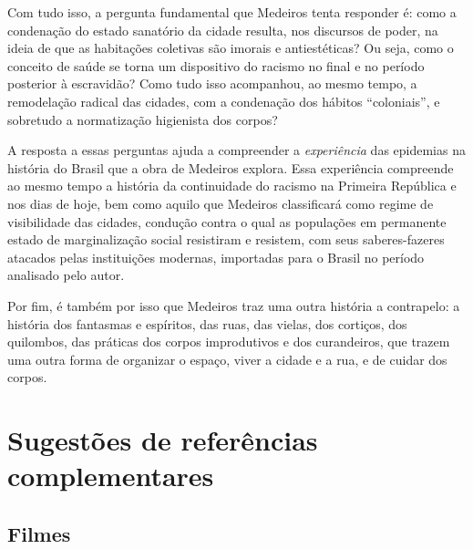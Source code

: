 \documentclass[12pt]{extarticle}
\begin{document}
Com tudo isso, a pergunta fundamental que Medeiros tenta responder é:
como a condenação do estado sanatório da cidade resulta, nos discursos
de poder, na ideia de que as habitações coletivas são imorais e
antiestéticas? Ou seja, como o conceito de saúde se torna um dispositivo
do racismo no final e no período posterior à escravidão? Como tudo isso
acompanhou, ao mesmo tempo, a remodelação radical das cidades, com a
condenação dos hábitos ``coloniais'', e sobretudo a normatização
higienista dos corpos?

A resposta a essas perguntas ajuda a compreender a \emph{experiência}
das epidemias na história do Brasil que a obra de Medeiros explora. Essa
experiência compreende ao mesmo tempo a história da continuidade do
racismo na Primeira República e nos dias de hoje, bem como aquilo que
Medeiros classificará como regime de visibilidade das cidades, condução
contra o qual as populações em permanente estado de marginalização
social resistiram e resistem, com seus saberes-fazeres atacados pelas
instituições modernas, importadas para o Brasil no período analisado
pelo autor.

Por fim, é também por isso que Medeiros traz uma outra história a
contrapelo: a história dos fantasmas e espíritos, das ruas, das vielas,
dos cortiços, dos quilombos, das práticas dos corpos improdutivos e dos
curandeiros, que trazem uma outra forma de organizar o espaço, viver a
cidade e a rua, e de cuidar dos corpos.



\section{Sugestões de referências complementares}


\subsection{Filmes}
\end{document}
